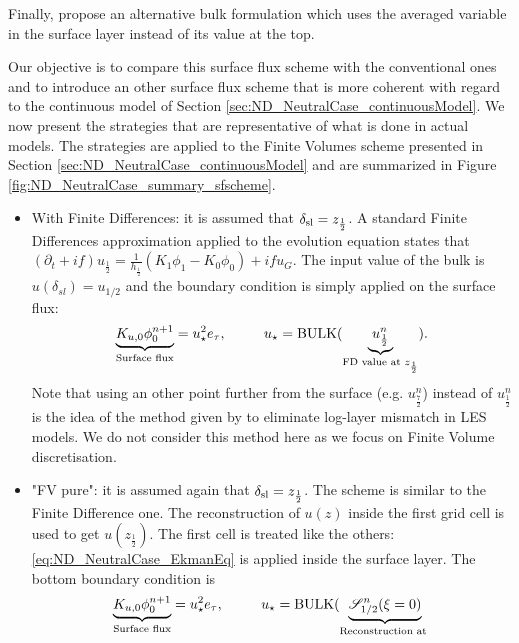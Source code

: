 Finally, \cite{nishizawa_surface_2018} propose an alternative
bulk formulation which uses the averaged variable in the surface layer
instead of its value at the top.
%
\par
Our objective is to compare this surface flux scheme with the
conventional ones
and to introduce an other surface flux scheme that is more coherent
with regard to the continuous model of Section
\ref{sec:ND_NeutralCase_continuousModel}.
We now present the strategies that are representative of
what is done in actual models. The strategies are applied to
the Finite Volumes scheme presented in Section
\ref{sec:ND_NeutralCase_continuousModel} and are
summarized in Figure \ref{fig:ND_NeutralCase_summary_sfscheme}.
  \begin{itemize}
	  \item With Finite Differences:
		  it is assumed that
		  $\delta_{\rm sl} = z_{\frac{1}{2}}$.
		A standard Finite Differences approximation applied to
		  the evolution equation states that
		  $(\partial_t+if) u_{\frac{1}{2}}
		  =\frac{1}{h_{\frac{1}{2}}}(K_1\phi_1 - K_0\phi_0)
		  + if u_G$.
		  The input value of the bulk is
		  $u(\delta_{sl}) = u_{1/2}$ and the boundary
		  condition is simply applied on the surface flux:
		\begin{equation}
		\underbrace{K_{u,0} \phi_0^{n+1}}_{\text{Surface flux}}
		= u_\star^2 e_\tau, ~~~~~~~~
			u_\star = {\rm BULK}(
			\underbrace{u_{\frac{1}{2}}^{n}}_{
				\text{FD value at }
			z_{\frac{1}{2}}}).
		\end{equation}
		  Note that using an other point further from
		  the surface (e.g. $u_{\frac{7}{2}}^n$) instead
		  of $u_{\frac{1}{2}}^n$ is the idea of the method
		  given by \citep{kawai_wall-modeling_2012}
		  to eliminate log-layer mismatch in LES models.
		  We do not consider this method here as we focus
		  on Finite Volume discretisation.
	  \item "FV pure": it is assumed again that
		  $\delta_{\rm sl} = z_{\frac{1}{2}}$.
		  The scheme is similar to the Finite Difference one.
	    The reconstruction of $u(z)$ inside the first grid cell
		  is used to get $u(z_{\frac{1}{2}})$.
		  The first cell is treated like the others:
		  \eqref{eq:ND_NeutralCase_EkmanEq} is
		  applied inside the surface layer.
	The bottom boundary condition is
	\begin{equation}
		\underbrace{K_{u,0} \phi_0^{n+1}}_{\text{Surface flux}}
		= u_\star^2 e_\tau, ~~~~~~~~
			u_\star = {\rm BULK}(
			\underbrace{{\cal S}_{1/2}^{n}(\xi=0)}_{
				\text{Reconstruction at }
}
\end{equation}
\end{itemize}
